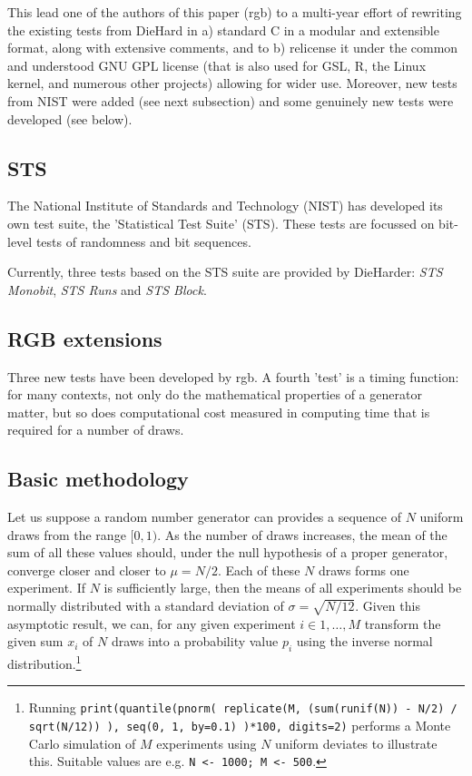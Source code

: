 \documentclass[12pt]{article}
\let\code=\texttt
\begin{document}
This lead one of the authors of this paper (rgb) to a multi-year effort of
rewriting the existing tests from DieHard in a) standard C in a modular and
extensible format, along with extensive comments, and to b) relicense it
under the common and understood GNU GPL license (that is also used for GSL,
R, the Linux kernel, and numerous other projects) allowing for wider use.
Moreover, new tests from NIST were added (see next subsection) and some
genuinely new tests were developed (see below).


\subsection{STS}

The National Institute of Standards and Technology (NIST) has developed its
own test suite, the 'Statistical Test Suite' (STS). These tests are focussed
on bit-level tests of randomness and bit sequences.   

Currently, three tests based on the STS suite are provided by DieHarder:
\textsl{STS Monobit}, \textsl{STS Runs} and \textsl{STS Block}. 

\subsection{RGB extensions}

Three new tests have been developed by rgb. A fourth 'test' is a timing
function: for many contexts, not only do the mathematical properties of a
generator matter, but so does computational cost measured in computing time
that is required for a number of draws.  

\subsection{Basic methodology}

Let us suppose a random number generator can provides a sequence of $N$
uniform draws from the range $[0, 1)$. As the number of draws increases, the
mean of the sum of all these values should, under the null hypothesis of a
proper generator, converge closer and closer to $\mu = N / 2$. Each of these
$N$ draws forms one experiment.  If $N$ is sufficiently large, then the means
of all experiments should be normally distributed with a standard deviation
of $\sigma = \sqrt{ N / 12}$. Given this asymptotic result, we can, for any
given experiment $i \in 1, \ldots, M$ transform the given sum $x_i$ of $N$
draws into a probability value $p_i$ using the inverse normal
distribution.\footnote{Running \code{print(quantile(pnorm( replicate(M,
    (sum(runif(N)) - N/2) / sqrt(N/12)) ), seq(0, 1, by=0.1) )*100,
    digits=2)} performs a Monte Carlo simulation of $M$ experiments using $N$
  uniform deviates to illustrate this. Suitable values are e.g. \code{N <-
    1000; M <- 500}.}
\end{document}
